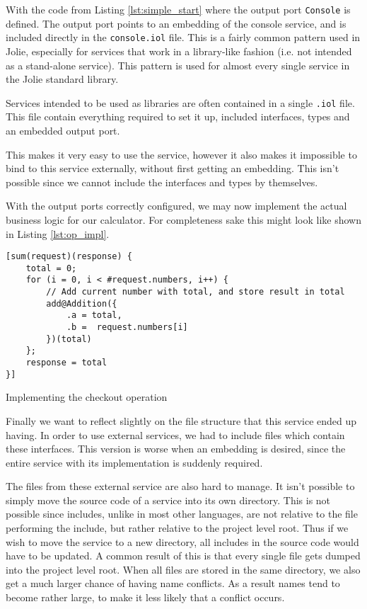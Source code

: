 With the code from Listing \ref{lst:simple_start} where the output port
\texttt{Console} is defined. The output port points to an embedding
of the console service, and is included directly in the \verb!console.iol!
file. This is a fairly common pattern used in Jolie, especially for services
that work in a library-like fashion (i.e. not intended as a stand-alone
service). This pattern is used for almost every single service in the Jolie
standard library.

\begin{observation}
    Services intended to be used as libraries are often contained in a single
    \verb!.iol! file. This file contain everything required to set it up,
    included interfaces, types and an embedded output port.

    This makes it very easy to use the service, however it also makes it
    impossible to bind to this service externally, without first getting an
    embedding. This isn't possible since we cannot include the interfaces and
    types by themselves.
\end{observation}

With the output ports correctly configured, we may now implement the actual
business logic for our calculator. For completeness sake this might look like
shown in Listing \ref{lst:op_impl}.

\begin{listing}[H]
\begin{verbatim}
[sum(request)(response) {
    total = 0;
    for (i = 0, i < #request.numbers, i++) {
        // Add current number with total, and store result in total
        add@Addition({
            .a = total,
            .b =  request.numbers[i]
        })(total)
    };
    response = total
}]
\end{verbatim}
\caption{Implementing the checkout operation}
\label{lst:op_impl}
\end{listing}

Finally we want to reflect slightly on the file structure that this service
ended up having. In order to use external services, we had to include files
which contain these interfaces. This version is worse when an embedding is
desired, since the entire service with its implementation is suddenly required.

The files from these external service are also hard to manage. It isn't
possible to simply move the source code of a service into its own directory.
This is not possible since includes, unlike in most other languages, are not
relative to the file performing the include, but rather relative to the project
level root. Thus if we wish to move the service to a new directory, all
includes in the source code would have to be updated. A common result of this
is that every single file gets dumped into the project level root. When all
files are stored in the same directory, we also get a much larger chance of
having name conflicts. As a result names tend to become rather large, to make
it less likely that a conflict occurs.

